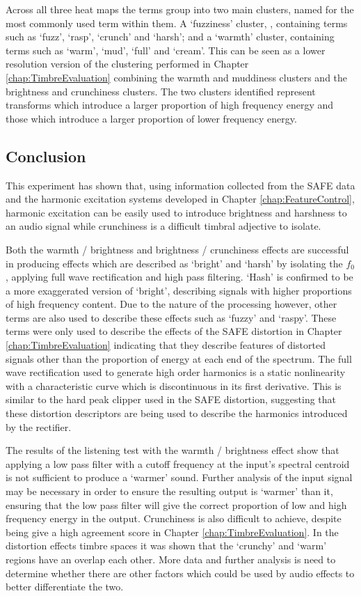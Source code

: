 			Across all three heat maps the terms group into two main clusters, named for the most commonly used
			term within them. A `fuzziness' cluster, , containing terms such as `fuzz', `rasp', `crunch' and
			`harsh'; and a `warmth' cluster, containing terms such as `warm', `mud', `full' and `cream'. This
			can be seen as a lower resolution version of the clustering performed in Chapter
			\ref{chap:TimbreEvaluation} combining the warmth and muddiness clusters and the brightness and
			crunchiness clusters. The two clusters identified represent transforms which introduce a larger
			proportion of high frequency energy and those which introduce a larger proportion of lower
			frequency energy.

	\subsection{Conclusion}
	\label{sec:PerceptualExperiments-SemanticControl-Conclusion}
		This experiment has shown that, using information collected from the SAFE data and the harmonic excitation
		systems developed in Chapter \ref{chap:FeatureControl}, harmonic excitation can be easily used to introduce
		brightness and harshness to an audio signal while crunchiness is a difficult timbral adjective to isolate.

		Both the warmth / brightness and brightness / crunchiness effects are successful in producing effects which
		are described as `bright' and `harsh' by isolating the $f_{0}$, applying full wave rectification and high
		pass filtering. `Hash' is confirmed to be a more exaggerated version of `bright', describing signals with
		higher proportions of high frequency content. Due to the nature of the processing however, other terms are
		also used to describe these effects such as `fuzzy' and `raspy'. These terms were only used to describe the
		effects of the SAFE distortion in Chapter \ref{chap:TimbreEvaluation} indicating that they describe
		features of distorted signals other than the proportion of energy at each end of the spectrum. The full
		wave rectification used to generate high order harmonics is a static nonlinearity with a characteristic
		curve which is discontinuous in its first derivative. This is similar to the hard peak clipper used in the
		SAFE distortion, suggesting that these distortion descriptors are being used to describe the harmonics
		introduced by the rectifier.

		The results of the listening test with the warmth / brightness effect show that applying a low pass filter
		with a cutoff frequency at the input's spectral centroid is not sufficient to produce a `warmer' sound.
		Further analysis of the input signal may be necessary in order to ensure the resulting output is `warmer'
		than it, ensuring that the low pass filter will give the correct proportion of low and high frequency
		energy in the output. Crunchiness is also difficult to achieve, despite being give a high agreement score
		in Chapter \ref{chap:TimbreEvaluation}. In the distortion effects timbre spaces it was shown that the
		`crunchy' and `warm' regions have an overlap each other. More data and further analysis is need to
		determine whether there are other factors which could be used by audio effects to better differentiate the
		two.

